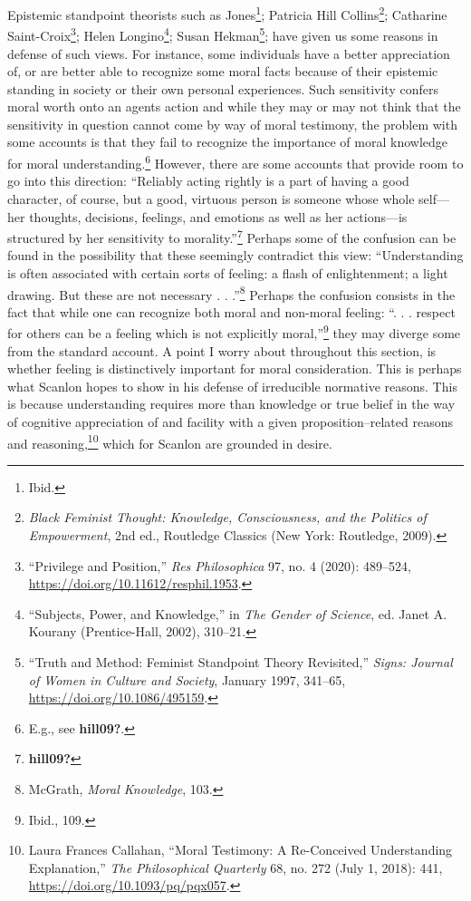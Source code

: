 \documentclass[phdthesis,12pt,final]{wuthesis}
\theoremstyle{definition}
\theoremstyle{definition}
\theoremstyle{definition}
\theoremstyle{definition}
\theoremstyle{remark}
\begin{document}
Epistemic standpoint theorists such as Jones\footnote{Ibid.}; Patricia Hill Collins\footnote{\emph{Black Feminist Thought: Knowledge, Consciousness, and the Politics of Empowerment}, 2nd ed., Routledge Classics (New York: Routledge, 2009).}; Catharine Saint-Croix\footnote{{``Privilege and {Position},''} \emph{Res Philosophica} 97, no. 4 (2020): 489--524, \url{https://doi.org/10.11612/resphil.1953}.}; Helen Longino\footnote{{``Subjects, {Power}, and {Knowledge},''} in \emph{The {Gender} of {Science}}, ed. Janet A. Kourany (Prentice-Hall, 2002), 310--21.}; Susan Hekman\footnote{{``Truth and Method: {Feminist} Standpoint Theory Revisited,''} \emph{Signs: Journal of Women in Culture and Society}, January 1997, 341--65, \url{https://doi.org/10.1086/495159}.}; have given us some reasons in defense of such views. For instance, some individuals have a better appreciation of, or are better able to recognize some moral facts because of their epistemic standing in society or their own personal experiences. Such sensitivity confers moral worth onto an agent\textquotesingle s action and while they may or may not think that the sensitivity in question cannot come by way of moral testimony, the problem with some accounts is that they fail to recognize the importance of moral knowledge for moral understanding.\footnote{E.g., see \textbf{hill09?}.} However, there are some accounts that provide room to go into this direction: ``Reliably acting rightly is a part of having a good character, of course, but a good, virtuous person is someone whose whole self---her thoughts, decisions, feelings, and emotions as well as her actions---is structured by her sensitivity to morality.''\footnote{\textbf{hill09?}} Perhaps some of the confusion can be found in the possibility that these seemingly contradict this view: ``Understanding is often associated with certain sorts of feeling: a flash of enlightenment; a light drawing. But these are not necessary . . .''\footnote{McGrath, \emph{Moral {Knowledge}}, 103.} Perhaps the confusion consists in the fact that while one can recognize both moral and non-moral feeling: ``. . . respect for others can be a feeling which is not explicitly moral,''\footnote{Ibid., 109.} they may diverge some from the standard account. A point I worry about throughout this section, is whether feeling is distinctively important for moral consideration. This is perhaps what Scanlon hopes to show in his defense of irreducible normative reasons. This is because understanding requires more than knowledge or true belief in the way of cognitive appreciation of and facility with a given proposition--related reasons and reasoning,\footnote{Laura Frances Callahan, {``Moral {Testimony}: {A Re-Conceived Understanding Explanation},''} \emph{The Philosophical Quarterly} 68, no. 272 (July 1, 2018): 441, \url{https://doi.org/10.1093/pq/pqx057}.} which for Scanlon are grounded in desire.
\end{document}
